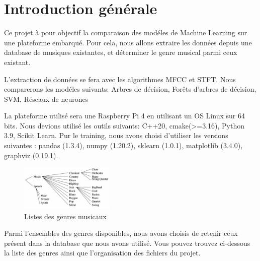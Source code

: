 \documentclass[10pt]{article}
\begin{document}
\tableofcontents
\pagebreak



\section{Introduction générale}

Ce projet à pour objectif la comparaison des modéles de Machine Learning sur une plateforme embarqué. Pour cela, nous allons extraire les données depuis une database de musiques existantes, et déterminer le genre musical parmi ceux existant.

L'extraction de données se fera avec les algorithmes MFCC et STFT. Nous comparerons les modéles suivants:
Arbres de décision, Forêts d'arbres de décision, SVM, Réseaux de neurones

La plateforme utilisé sera une Raspberry Pi 4 en utilisant un OS Linux sur 64 bits. Nous devions utilisé les outils suivants: C++20, cmake(>=3.16), Python 3.9, Scikit Learn. Pur le training, nous avons choisi d'utiliser les versions suivantes : pandas (1.3.4), numpy (1.20.2), sklearn (1.0.1), matplotlib (3.4.0), graphviz (0.19.1). \\


\begin{figure}[h!]
\centering
\includegraphics[width=0.4\textwidth]{listofgenre.png}
\caption{Listes des genres musicaux}
\end{figure}
Parmi l'ensembles des genres disponibles, nous avons choisis de retenir ceux présent dans la database que nous avons utilisé. Vous pouvez trouvez ci-dessous la liste des genres ainsi que l'organisation des fichiers du projet. 
\end{document}
